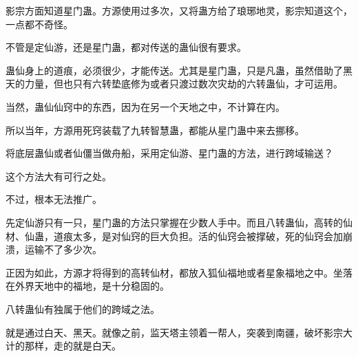 \begin{this_body}
影宗方面知道星门蛊。方源使用过多次，又将蛊方给了琅琊地灵，影宗知道这个，一点都不奇怪。

不管是定仙游，还是星门蛊，都对传送的蛊仙很有要求。

蛊仙身上的道痕，必须很少，才能传送。尤其是星门蛊，只是凡蛊，虽然借助了黑天的力量，但也只有六转垫底修为或者只渡过数次灾劫的六转蛊仙，才可运用。

当然，蛊仙仙窍中的东西，因为在另一个天地之中，不计算在内。

所以当年，方源用死窍装载了九转智慧蛊，都能从星门蛊中来去挪移。

将底层蛊仙或者仙僵当做舟船，采用定仙游、星门蛊的方法，进行跨域输送？

这个方法大有可行之处。

不过，根本无法推广。

先定仙游只有一只，星门蛊的方法只掌握在少数人手中。而且八转蛊仙，高转的仙材、仙蛊，道痕太多，是对仙窍的巨大负担。活的仙窍会被撑破，死的仙窍会加崩溃，运输不了多少次。

正因为如此，方源才将得到的高转仙材，都放入狐仙福地或者星象福地之中。坐落在外界天地中的福地，是十分稳固的。

八转蛊仙有独属于他们的跨域之法。

就是通过白天、黑天。就像之前，监天塔主领着一帮人，突袭到南疆，破坏影宗大计的那样，走的就是白天。

\end{this_body}

